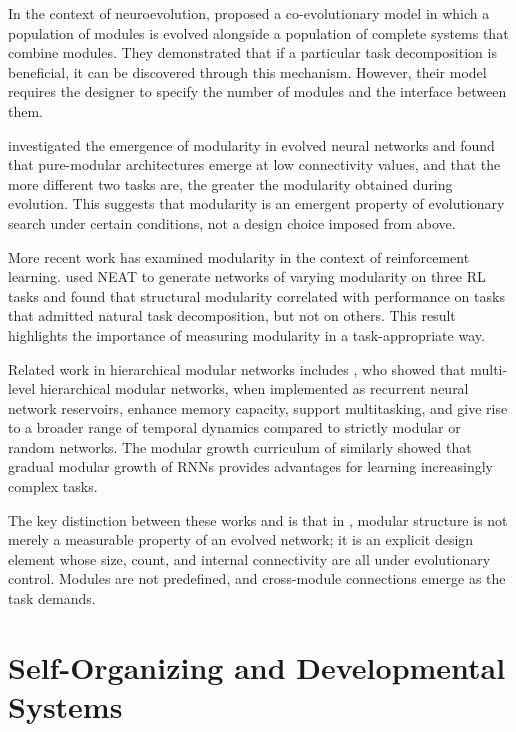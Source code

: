 In the context of neuroevolution, \citet{khare2005coevolutionary} proposed a
co-evolutionary model in which a population of modules is evolved alongside a
population of complete systems that combine modules. They demonstrated that if
a particular task decomposition is beneficial, it can be discovered through
this mechanism. However, their model requires the designer to specify the
number of modules and the interface between them.

\citet{landassuri2012evolution} investigated the emergence of modularity in
evolved neural networks and found that pure-modular architectures emerge at
low connectivity values, and that the more different two tasks are, the
greater the modularity obtained during evolution. This suggests that modularity
is an emergent property of evolutionary search under certain conditions, not a
design choice imposed from above.

More recent work has examined modularity in the context of reinforcement
learning. \citet{munn2024towards} used NEAT to generate networks of varying
modularity on three RL tasks and found that structural modularity correlated
with performance on tasks that admitted natural task decomposition, but not on
others. This result highlights the importance of measuring modularity in a
task-appropriate way.

Related work in hierarchical modular networks includes \citet{rodriguez2025hierarchical},
who showed that multi-level hierarchical modular networks, when implemented as
recurrent neural network reservoirs, enhance memory capacity, support
multitasking, and give rise to a broader range of temporal dynamics compared
to strictly modular or random networks. The modular growth curriculum of
\citet{2024modulargrowth} similarly showed that gradual modular growth of RNNs
provides advantages for learning increasingly complex tasks.

The key distinction between these works and \modnet{} is that in \modnet{},
modular structure is not merely a measurable property of an evolved network;
it is an explicit design element whose size, count, and internal connectivity
are all under evolutionary control. Modules are not predefined, and
cross-module connections emerge as the task demands.

\section{Self-Organizing and Developmental Systems}
\label{sec:selforg}

